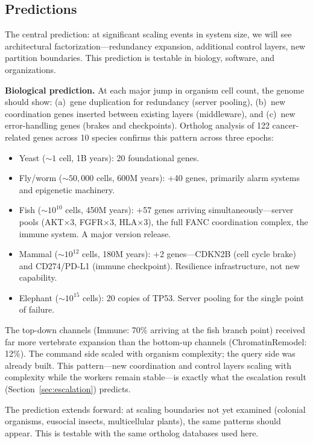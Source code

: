 \documentclass[11pt]{article}
\theoremstyle{definition}
\theoremstyle{remark}
\begin{document}
\subsection{Predictions}

The central prediction: at significant scaling events in system
size, we will see architectural factorization---redundancy expansion,
additional control layers, new partition boundaries. This prediction
is testable in biology, software, and organizations.

\textbf{Biological prediction.}
At each major jump in organism cell count, the genome should show:
(a)~gene duplication for redundancy (server pooling),
(b)~new coordination genes inserted between existing layers
(middleware), and (c)~new error-handling genes (brakes and
checkpoints). Ortholog analysis of 122 cancer-related genes across
10 species confirms this pattern across three epochs:

\begin{itemize}
\item Yeast ($\sim 1$ cell, 1B years): 20 foundational genes.
\item Fly/worm ($\sim 50{,}000$ cells, 600M years): +40 genes,
   primarily alarm systems and epigenetic machinery.
\item Fish ($\sim 10^{10}$ cells, 450M years): +57 genes arriving
   simultaneously---server pools (AKT$\times 3$, FGFR$\times 3$,
   HLA$\times 3$), the full FANC coordination complex, the immune
   system. A major version release.
\item Mammal ($\sim 10^{12}$ cells, 180M years): +2 genes---CDKN2B
   (cell cycle brake) and CD274/PD-L1 (immune checkpoint). Resilience
   infrastructure, not new capability.
\item Elephant ($\sim 10^{15}$ cells): 20 copies of TP53. Server
   pooling for the single point of failure.
\end{itemize}

The top-down channels (Immune: 70\% arriving at the fish branch point)
received far more vertebrate expansion than the bottom-up channels
(ChromatinRemodel: 12\%). The command side scaled with organism
complexity; the query side was already built. This pattern---new
coordination and control layers scaling with complexity while the
workers remain stable---is exactly what the escalation result
(Section~\ref{sec:escalation}) predicts.

The prediction extends forward: at scaling boundaries not yet examined
(colonial organisms, eusocial insects, multicellular plants), the same
patterns should appear. This is testable with the same ortholog
databases used here.
\end{document}
